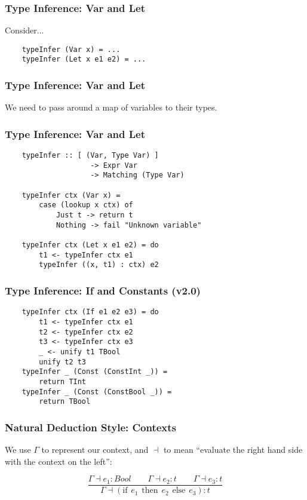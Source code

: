 \documentclass{beamer}
\begin{document}
\begin{frame}[fragile]
\frametitle{Type Inference: Var and Let}

Consider...

{\tt\large{
\begin{verbatim}
    typeInfer (Var x) = ...
    typeInfer (Let x e1 e2) = ...
\end{verbatim}
}}
\end{frame}

\begin{frame}
\frametitle{Type Inference: Var and Let}
\begin{center}
\Large{
We need to pass around a map of variables to their types.
}
\end{center}
\end{frame}

\begin{frame}[fragile]
\frametitle{Type Inference: Var and Let}

{\tt\large{
\begin{verbatim}
    typeInfer :: [ (Var, Type Var) ]
                    -> Expr Var
                    -> Matching (Type Var)

    typeInfer ctx (Var x) = 
        case (lookup x ctx) of
            Just t -> return t
            Nothing -> fail "Unknown variable"

    typeInfer ctx (Let x e1 e2) = do
        t1 <- typeInfer ctx e1
        typeInfer ((x, t1) : ctx) e2
\end{verbatim}
}}
\end{frame}


\begin{frame}[fragile]
\frametitle{Type Inference: If and Constants (v2.0)}

{\tt\large{
\begin{verbatim}
    typeInfer ctx (If e1 e2 e3) = do
        t1 <- typeInfer ctx e1
        t2 <- typeInfer ctx e2
        t3 <- typeInfer ctx e3
        _ <- unify t1 TBool
        unify t2 t3
    typeInfer _ (Const (ConstInt _)) =
        return TInt
    typeInfer _ (Const (ConstBool _)) =
        return TBool
\end{verbatim}
}}
\end{frame}

\begin{frame}
\frametitle{Natural Deduction Style: Contexts}
We use $\Gamma$ to represent our context, and $\dashv$ to mean ``evaluate
the right hand side with the context on the left'':

\LARGE{
$$\frac{\Gamma\dashv{}e_1:Bool\qquad\Gamma\dashv{}e_2:t\qquad\Gamma\dashv{}e_3:t}{\Gamma\dashv{}(\text{if}\hspace{5pt}e_1\hspace{5pt}\text{then}\hspace{5pt}e_2
\hspace{5pt}\text{else}\hspace{5pt}e_3):t}$$
}
\end{frame}
\end{document}
